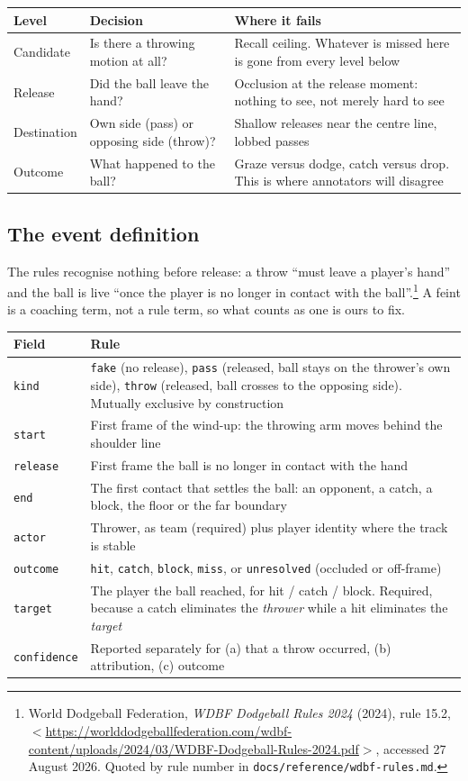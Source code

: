\documentclass[10pt,a4paper]{article}
\begin{document}
{\footnotesize
\begin{xltabular}{\textwidth}{L{22mm} L{46mm} X}
\toprule
\textbf{Level} & \textbf{Decision} & \textbf{Where it fails}\\
\midrule
Candidate & Is there a throwing motion at all? & Recall ceiling. Whatever is missed here is gone from every level below\\
Release & Did the ball leave the hand? & Occlusion at the release moment: nothing to see, not merely hard to see\\
Destination & Own side (pass) or opposing side (throw)? & Shallow releases near the centre line, lobbed passes\\
Outcome & What happened to the ball? & Graze versus dodge, catch versus drop. This is where annotators will disagree\\
\bottomrule
\end{xltabular}}

\subsection{The event definition}

The rules recognise nothing before release: a throw ``must leave a player's hand'' and the
ball is live ``once the player is no longer in contact with the ball''.\footnote{World
Dodgeball Federation, \emph{WDBF Dodgeball Rules 2024} (2024), rule 15.2,
$<$\url{https://worlddodgeballfederation.com/wdbf-content/uploads/2024/03/WDBF-Dodgeball-Rules-2024.pdf}$>$,
accessed 27 August 2026. Quoted by rule number in \texttt{docs/reference/wdbf-rules.md}.} A feint is a
coaching term, not a rule term, so what counts as one is ours to fix.

{\footnotesize
\begin{xltabular}{\textwidth}{l X}
\toprule
\textbf{Field} & \textbf{Rule}\\
\midrule
\texttt{kind} & \texttt{fake} (no release), \texttt{pass} (released, ball stays on the thrower's own side), \texttt{throw} (released, ball crosses to the opposing side). Mutually exclusive by construction\\
\texttt{start} & First frame of the wind-up: the throwing arm moves behind the shoulder line\\
\texttt{release} & First frame the ball is no longer in contact with the hand\\
\texttt{end} & The first contact that settles the ball: an opponent, a catch, a block, the floor or the far boundary\\
\texttt{actor} & Thrower, as team (required) plus player identity where the track is stable\\
\texttt{outcome} & \texttt{hit}, \texttt{catch}, \texttt{block}, \texttt{miss}, or \texttt{unresolved} (occluded or off-frame)\\
\texttt{target} & The player the ball reached, for hit / catch / block. Required, because a catch eliminates the \emph{thrower} while a hit eliminates the \emph{target}\\
\texttt{confidence} & Reported separately for (a) that a throw occurred, (b) attribution, (c) outcome\\
\bottomrule
\end{xltabular}}
\end{document}
